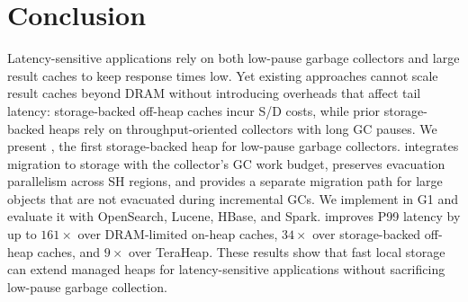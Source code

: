 \section{Conclusion}

Latency-sensitive applications rely on both low-pause garbage collectors and large result caches to keep response times low.
Yet existing approaches cannot scale result caches beyond DRAM without introducing overheads that affect tail latency: storage-backed off-heap caches incur S/D costs, while prior storage-backed heaps rely on throughput-oriented collectors with long GC pauses.
We present \chipperName{}, the first storage-backed heap for low-pause garbage collectors.
\chipperName{} integrates migration to storage with the collector's GC work budget, preserves evacuation parallelism across SH regions, and provides a separate migration path for large objects that are not evacuated during incremental GCs.
We implement \chipperName{} in G1 and evaluate it with OpenSearch, Lucene, HBase, and Spark.
\chipperName{} improves P99 latency by up to $161\times$ over DRAM-limited on-heap caches, $34\times$ over storage-backed off-heap caches, and $9\times$ over TeraHeap.
These results show that fast local storage can extend managed heaps for latency-sensitive applications without sacrificing low-pause garbage collection.
